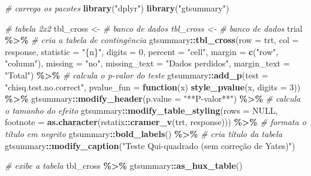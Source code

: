 \documentclass[
]{book}
\newenvironment{Shaded}{\begin{snugshade}}{\end{snugshade}}
\newcommand{\AttributeTok}[1]{\textcolor[rgb]{0.13,0.29,0.53}{#1}}
\newcommand{\CommentTok}[1]{\textcolor[rgb]{0.56,0.35,0.01}{\textit{#1}}}
\newcommand{\ConstantTok}[1]{\textcolor[rgb]{0.56,0.35,0.01}{#1}}
\newcommand{\ControlFlowTok}[1]{\textcolor[rgb]{0.13,0.29,0.53}{\textbf{#1}}}
\newcommand{\DecValTok}[1]{\textcolor[rgb]{0.00,0.00,0.81}{#1}}
\newcommand{\FunctionTok}[1]{\textcolor[rgb]{0.13,0.29,0.53}{\textbf{#1}}}
\newcommand{\NormalTok}[1]{#1}
\newcommand{\OtherTok}[1]{\textcolor[rgb]{0.56,0.35,0.01}{#1}}
\newcommand{\SpecialCharTok}[1]{\textcolor[rgb]{0.81,0.36,0.00}{\textbf{#1}}}
\newcommand{\StringTok}[1]{\textcolor[rgb]{0.31,0.60,0.02}{#1}}
\begin{document}
\begin{Shaded}
\begin{Highlighting}[]
\CommentTok{\# carrega os pacotes}
\FunctionTok{library}\NormalTok{(}\StringTok{"dplyr"}\NormalTok{)}
\FunctionTok{library}\NormalTok{(}\StringTok{"gtsummary"}\NormalTok{)}

\CommentTok{\# tabela 2x2}
\NormalTok{tbl\_cross }\OtherTok{\textless{}{-}} \CommentTok{\# banco de dados tbl\_cross \textless{}{-} \# banco de dados}
\NormalTok{trial }\SpecialCharTok{\%\textgreater{}\%}
    \CommentTok{\# cria a tabela de contingência}
\NormalTok{gtsummary}\SpecialCharTok{::}\FunctionTok{tbl\_cross}\NormalTok{(}\AttributeTok{row =}\NormalTok{ trt, }\AttributeTok{col =}\NormalTok{ response, }\AttributeTok{statistic =} \StringTok{"\{n\}"}\NormalTok{, }\AttributeTok{digits =} \DecValTok{0}\NormalTok{, }\AttributeTok{percent =} \StringTok{"cell"}\NormalTok{,}
    \AttributeTok{margin =} \FunctionTok{c}\NormalTok{(}\StringTok{"row"}\NormalTok{, }\StringTok{"column"}\NormalTok{), }\AttributeTok{missing =} \StringTok{"no"}\NormalTok{, }\AttributeTok{missing\_text =} \StringTok{"Dados perdidos"}\NormalTok{,}
    \AttributeTok{margin\_text =} \StringTok{"Total"}\NormalTok{) }\SpecialCharTok{\%\textgreater{}\%}
    \CommentTok{\# calcula o p{-}valor do teste}
\NormalTok{gtsummary}\SpecialCharTok{::}\FunctionTok{add\_p}\NormalTok{(}\AttributeTok{test =} \StringTok{"chisq.test.no.correct"}\NormalTok{, }\AttributeTok{pvalue\_fun =} \ControlFlowTok{function}\NormalTok{(x) }\FunctionTok{style\_pvalue}\NormalTok{(x,}
    \AttributeTok{digits =} \DecValTok{3}\NormalTok{)) }\SpecialCharTok{\%\textgreater{}\%}
\NormalTok{    gtsummary}\SpecialCharTok{::}\FunctionTok{modify\_header}\NormalTok{(}\AttributeTok{p.value =} \StringTok{"**P{-}valor**"}\NormalTok{) }\SpecialCharTok{\%\textgreater{}\%}
    \CommentTok{\# calcula o tamanho do efeito}
\NormalTok{gtsummary}\SpecialCharTok{::}\FunctionTok{modify\_table\_styling}\NormalTok{(}\AttributeTok{rows =} \ConstantTok{NULL}\NormalTok{, }\AttributeTok{footnote =} \FunctionTok{as.character}\NormalTok{(rstatix}\SpecialCharTok{::}\FunctionTok{cramer\_v}\NormalTok{(trt,}
\NormalTok{    response))) }\SpecialCharTok{\%\textgreater{}\%}
    \CommentTok{\# formata o título em negrito}
\NormalTok{gtsummary}\SpecialCharTok{::}\FunctionTok{bold\_labels}\NormalTok{() }\SpecialCharTok{\%\textgreater{}\%}
    \CommentTok{\# cria título da tabela}
\NormalTok{gtsummary}\SpecialCharTok{::}\FunctionTok{modify\_caption}\NormalTok{(}\StringTok{"Teste Qui{-}quadrado (sem correção de Yates)"}\NormalTok{)}

\CommentTok{\# exibe a tabela}
\NormalTok{tbl\_cross }\SpecialCharTok{\%\textgreater{}\%}
\NormalTok{    gtsummary}\SpecialCharTok{::}\FunctionTok{as\_hux\_table}\NormalTok{()}
\end{Highlighting}
\end{Shaded}
\end{document}
